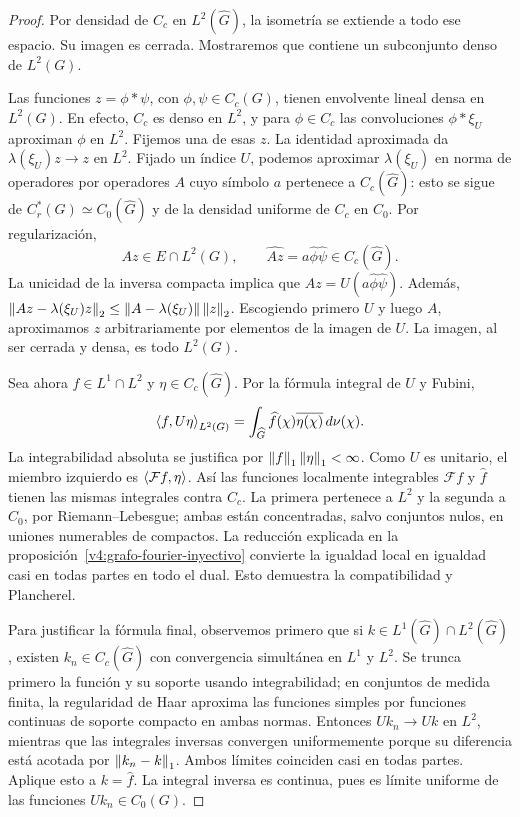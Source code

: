 \begin{proof}
Por densidad de $C_c$ en $L^2(\widehat G)$, la isometría se extiende a todo ese espacio. Su imagen es cerrada. Mostraremos que contiene un subconjunto denso de $L^2(G)$.

Las funciones $z=\phi*\psi$, con $\phi,\psi\in C_c(G)$, tienen envolvente lineal densa en $L^2(G)$. En efecto, $C_c$ es denso en $L^2$, y para $\phi\in C_c$ las convoluciones $\phi*\xi_U$ aproximan $\phi$ en $L^2$. Fijemos una de esas $z$. La identidad aproximada da $\lambda(\xi_U)z\to z$ en $L^2$. Fijado un índice $U$, podemos aproximar $\lambda(\xi_U)$ en norma de operadores por operadores $A$ cuyo símbolo $a$ pertenece a $C_c(\widehat G)$: esto se sigue de $C_r^*(G)\simeq C_0(\widehat G)$ y de la densidad uniforme de $C_c$ en $C_0$. Por regularización,
\[
 Az\in E\cap L^2(G),\qquad
 \widehat{Az}=a\widehat\phi\widehat\psi\in C_c(\widehat G).
\]
La unicidad de la inversa compacta implica que $Az=U(a\widehat\phi\widehat\psi)$. Además,
$\left\lVert Az-\lambda(\xi_U)z\right\rVert_2\le\left\lVert A-\lambda(\xi_U)\right\rVert\left\lVert z\right\rVert_2$.
Escogiendo primero $U$ y luego $A$, aproximamos $z$ arbitrariamente por elementos de la imagen de $U$. La imagen, al ser cerrada y densa, es todo $L^2(G)$.

Sea ahora $f\in L^1\cap L^2$ y $\eta\in C_c(\widehat G)$. Por la fórmula integral de $U$ y Fubini,
\[
 \left\langle f,U\eta\right\rangle_{L^2(G)}
 =\int_{\widehat G}\widehat f(\chi)\overline{\eta(\chi)}\,d\nu(\chi).
\]
La integrabilidad absoluta se justifica por $\left\lVert f\right\rVert_1\left\lVert\eta\right\rVert_1<\infty$. Como $U$ es unitario, el miembro izquierdo es $\left\langle\mathcal Ff,\eta\right\rangle$. Así las funciones localmente integrables $\mathcal Ff$ y $\widehat f$ tienen las mismas integrales contra $C_c$. La primera pertenece a $L^2$ y la segunda a $C_0$, por Riemann--Lebesgue; ambas están concentradas, salvo conjuntos nulos, en uniones numerables de compactos. La reducción explicada en la proposición~\ref{v4:grafo-fourier-inyectivo} convierte la igualdad local en igualdad casi en todas partes en todo el dual. Esto demuestra la compatibilidad y Plancherel.

Para justificar la fórmula final, observemos primero que si $k\in L^1(\widehat G)\cap L^2(\widehat G)$, existen $k_n\in C_c(\widehat G)$ con convergencia simultánea en $L^1$ y $L^2$. Se trunca primero la función y su soporte usando integrabilidad; en conjuntos de medida finita, la regularidad de Haar aproxima las funciones simples por funciones continuas de soporte compacto en ambas normas. Entonces $Uk_n\to Uk$ en $L^2$, mientras que las integrales inversas convergen uniformemente porque su diferencia está acotada por $\left\lVert k_n-k\right\rVert_1$. Ambos límites coinciden casi en todas partes. Aplique esto a $k=\widehat f$. La integral inversa es continua, pues es límite uniforme de las funciones $Uk_n\in C_0(G)$.
\end{proof}

